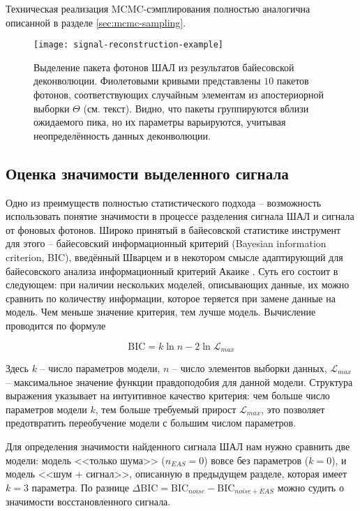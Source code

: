 Техническая реализация MCMC-сэмплирования полностью аналогична описанной в разделе \ref{sec:mcmc-sampling}.

\begin{figure}
	\centering
	\texttt{[image: signal-reconstruction-example]}
	\caption{Выделение пакета фотонов ШАЛ из результатов байесовской деконволюции. Фиолетовыми кривыми представлены $10$ пакетов фотонов, соответствующих случайным элементам из апостериорной выборки $\Theta$ (см. текст). Видно, что пакеты группируются вблизи ожидаемого пика, но их параметры варьируются, учитывая неопределённость данных деконволюции.}
	\label{pic:signal-reconstruction-example}
\end{figure}


\subsection{Оценка значимости выделенного сигнала}

Одно из преимуществ полностью статистического подхода -- возможность использовать понятие значимости в процессе разделения сигнала ШАЛ и сигнала от фоновых фотонов. Широко принятый в байесовской статистике инструмент для этого -- байесовский информационный критерий (Bayesian information criterion, BIC), введённый Шварцем \cite{Schwarz1978} и в некотором смысле адаптирующий для байесовского анализа информационный критерий Акаике \cite{Akaike1974}. Суть его состоит в следующем: при наличии нескольких моделей, описывающих данные, их можно сравнить по количеству информации, которое теряется при замене данные на модель. Чем меньше значение критерия, тем лучше модель. Вычисление проводится по формуле

\begin{equation}
	\mathrm{BIC} = k \ln n - 2 \ln \mathcal{L}_{max}
\end{equation}

Здесь $k$ -- число параметров модели, $n$ -- число элементов выборки данных, $\mathcal{L}_{max}$ -- максимальное значение функции правдоподобия для данной модели. Структура выражения указывает на интуитивное качество критерия: чем больше число параметров модели $k$, тем больше требуемый прирост $\mathcal{L}_{max}$, это позволяет предотвратить переобучение модели с большим числом параметров.

Для определения значимости найденного сигнала ШАЛ нам нужно сравнить две модели: модель <<только шума>> ($n_{EAS} = 0$) вовсе без параметров ($k=0$), и модель <<шум + сигнал>>, описанную в предыдущем разделе, которая имеет $k=3$ параметра. По разнице $ \Delta \mathrm{BIC} = \mathrm{BIC}_{noise} - \mathrm{BIC}_{noise + EAS}$ можно судить о значимости восстановленного сигнала.

